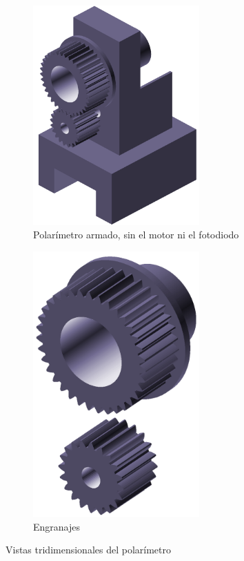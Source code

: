 \begin{figure}[H]
    \begin{subfigure}{0.45\textwidth}
        \centering
        \includegraphics[width=0.7\textwidth]{fig/polarimetro/soporte_all}
        \caption{Polarímetro armado, sin el motor ni el fotodiodo}
        \label{fig:polarimetro/soporte}
    \end{subfigure}
    \begin{subfigure}{0.45\textwidth}
        \centering
        \includegraphics[width=0.7\textwidth]{fig/polarimetro/engranajes}
        \caption{Engranajes}
        \label{fig:polarimetro/engranajes}
    \end{subfigure}
    \caption{Vistas tridimensionales del polarímetro}
\end{figure}

